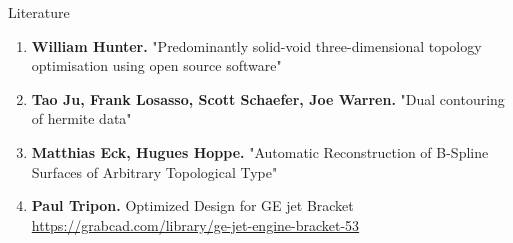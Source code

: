 \begin{frame}{Literature}
\begin{enumerate}
\item \textbf{William Hunter.} "Predominantly solid-void three-dimensional topology optimisation using open source software"
\item \textbf{Tao Ju, Frank Losasso, Scott Schaefer, Joe Warren.} "Dual contouring of hermite data"
\item \textbf{Matthias Eck, Hugues Hoppe.} "Automatic Reconstruction of B-Spline Surfaces of Arbitrary Topological Type"
\item \textbf{Paul Tripon.} Optimized Design for GE jet Bracket \url{https://grabcad.com/library/ge-jet-engine-bracket-53}
\end{enumerate}
\end{frame}
